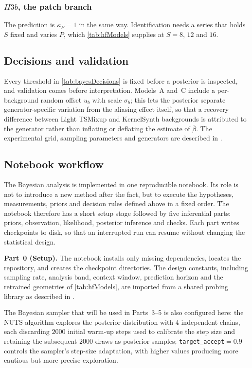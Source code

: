 \subsubsection{$H3b$, the patch branch}
The prediction is $\kappa_P=1$ in the same way. Identification needs a series that holds $S$ fixed and varies $P$, which \autoref{tab:hfModels} supplies at $S{=}8$, $12$ and $16$.

\subsection{Decisions and validation}
Every threshold in \autoref{tab:bayesDecisions} is fixed before a posterior is inspected, and validation comes before interpretation. Models~A and~C include a per-background random offset $u_b$ with scale $\sigma_b$; this lets the posterior separate generator-specific variation from the aliasing effect itself, so that a recovery difference between Light TSMixup and KernelSynth backgrounds is attributed to the generator rather than inflating or deflating the estimate of $\bar\beta$. The experimental grid, sampling parameters and generators are described in .



\subsection{Notebook workflow}

The Bayesian analysis is implemented in one reproducible notebook. Its role is not to introduce a new method after the fact, but to execute the hypotheses, measurements, priors and decision rules defined above in a fixed order. The notebook therefore has a short setup stage followed by five inferential parts: priors, observation, likelihood, posterior inference and checks. Each part writes checkpoints to disk, so that an interrupted run can resume without changing the statistical design.

\medskip
\textbf{Part~0 (Setup).} The notebook installs only missing dependencies, locates the repository, and creates the checkpoint directories. The design constants, including sampling rate, analysis band, context window, prediction horizon and the retrained geometries of \autoref{tab:hfModels}, are imported from a shared probing library as described in .

The Bayesian sampler that will be used in Parts~3--5 is also configured here: the NUTS algorithm explores the posterior distribution with $4$ independent chains, each discarding $2000$ initial warm-up steps used to calibrate the step size and retaining the subsequent $2000$ draws as posterior samples; \texttt{target\_accept}${}=0.9$ controls the sampler's step-size adaptation, with higher values producing more cautious but more precise exploration.

